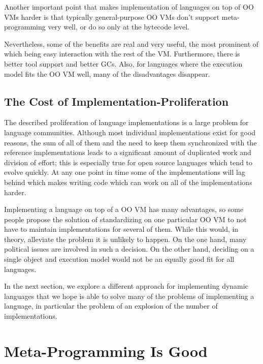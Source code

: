 \documentclass{llncs}
\begin{document}
\begin{itemize}
Another important point that makes implementation of languages on top of OO VMs
harder is that typically general-purpose OO VMs don't support meta-programming
very well, or do so only at the bytecode level.
\end{itemize}

Nevertheless, some of the benefits are real and very useful, the most
prominent of which being easy interaction with the rest of the VM. Furthermore, there
is better tool support and better GCs. Also, for languages where the execution
model fits the OO VM well, many of the disadvantages disappear.


\subsection{The Cost of Implementation-Proliferation}

The described proliferation of language implementations is a large problem for
language communities. Although most individual implementations exist for good
reasons, the sum of all of them and the need to keep them synchronized with the
reference implementations leads to a significant amount of duplicated work and division of
effort; this is especially true for open source languages which tend to evolve
quickly. At any one point in time some of the implementations will lag behind
which makes writing code which can work on all of the implementations harder.

Implementing a language on top of a OO VM has many advantages, so some
people propose the solution of standardizing on one particular OO VM to not have
to maintain implementations for several of them. While this would, in theory,
alleviate the problem it is unlikely to happen. On the one hand, many political
issues are involved in such a decision. On the other hand, deciding on a single
object and execution model would not be an equally good fit for all languages.

In the next section, we explore a different approach for implementing
dynamic languages that we hope is able to solve many of the problems of
implementing a language, in particular the problem of an explosion of the number
of implementations.

\section{Meta-Programming Is Good}
\label{sect:metaprogramming}
\end{document}
